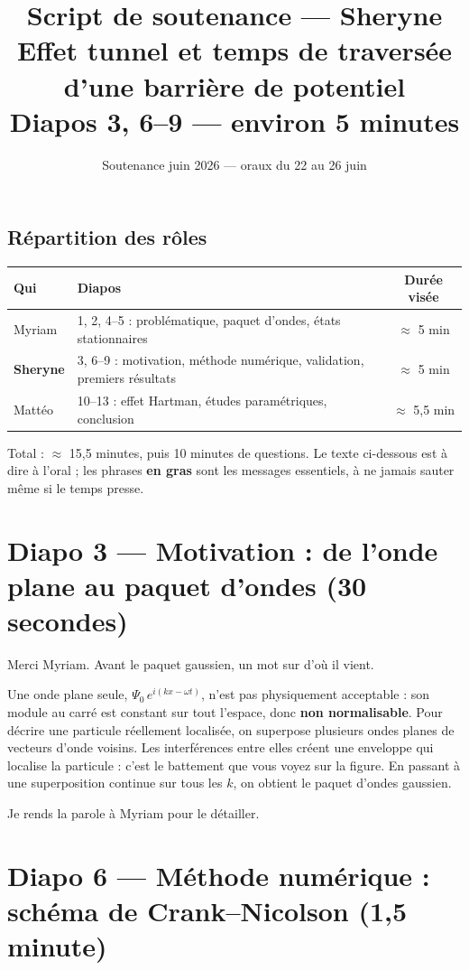 \documentclass[11pt,a4paper]{article}
\title{\textbf{Script de soutenance --- Sheryne}\\
	\large Effet tunnel et temps de traversée d'une barrière de potentiel\\
	\normalsize Diapos 3, 6--9 --- environ 5 minutes}
\author{}
\date{Soutenance juin 2026 --- oraux du 22 au 26 juin}
\newcommand{\diapo}[2]{\section*{Diapo #1 --- #2}}
\begin{document}
	\maketitle
	
	\subsection*{Répartition des rôles}
	
	\begin{center}
		\begin{tabular}{llc}
			\toprule
			Qui & Diapos & Durée visée \\
			\midrule
			Myriam & 1, 2, 4--5 : problématique, paquet d'ondes, états stationnaires & $\approx$ 5 min \\
			\textbf{Sheryne} & 3, 6--9 : motivation, méthode numérique, validation, premiers résultats & $\approx$ 5 min \\
			Mattéo & 10--13 : effet Hartman, études paramétriques, conclusion & $\approx$ 5,5 min \\
			\bottomrule
		\end{tabular}
	\end{center}
	
	Total : $\approx$ 15,5 minutes, puis 10 minutes de questions. Le texte ci-dessous est à dire
	à l'oral ; les phrases \textbf{en gras} sont les messages essentiels, à ne jamais
	sauter même si le temps presse.
	
	\diapo{3}{Motivation : de l'onde plane au paquet d'ondes (30 secondes)}
	
	Merci Myriam. Avant le paquet gaussien, un mot sur d'où il vient.
	
	Une onde plane seule, $\Psi_0\,e^{i(kx-\omega t)}$, n'est pas physiquement
	acceptable : son module au carré est constant sur tout l'espace, donc
	\textbf{non normalisable}. Pour décrire une particule réellement localisée, on
	superpose plusieurs ondes planes de vecteurs d'onde voisins. Les interférences
	entre elles créent une enveloppe qui localise la particule : c'est le
	battement que vous voyez sur la figure. En passant à une superposition
	continue sur tous les $k$, on obtient le paquet d'ondes gaussien.
	
	Je rends la parole à Myriam pour le détailler.
	
	\diapo{6}{Méthode numérique : schéma de Crank--Nicolson (1,5 minute)}
	
\end{document}
